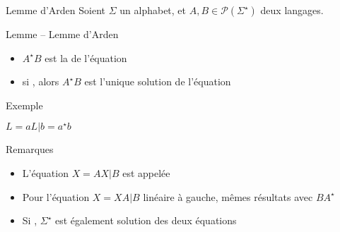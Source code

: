
\begingroup

\begin{frame}{Lemme d'Arden}
  Soient $\Sigma$ un alphabet, et $A, B \in \mathscr{P}(\Sigma^\star)$ deux langages.
  \begin{block}{Lemme -- Lemme d'Arden}
    \begin{itemize}
    \item \alert{$A^\star B$} est la  de l'équation 
    \item si , alors \alert{$A^\star B$} est l'\alert{unique} solution de l'équation 
    \end{itemize}
  \end{block}
  \begin{exampleblock}{Exemple}
    \noindent\begin{minipage}{.4\textwidth}
    \end{minipage}%
    \begin{minipage}{.6\textwidth}
      $ L = a L | b = a^\star b$
    \end{minipage}
  \end{exampleblock}
  \begin{block}{Remarques}
    \begin{itemize}
    \item {\small L'équation $X = AX | B$ est appelée }
    \item {\small Pour l'équation $X = XA | B$ linéaire à gauche, mêmes résultats avec $B A^\star$}
    \item {\small Si , $\Sigma^\star$ est également solution des deux équations}
    \end{itemize}
  \end{block}
\end{frame}

\endgroup

